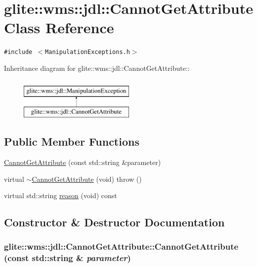 \hypertarget{classglite_1_1wms_1_1jdl_1_1CannotGetAttribute}{
\section{glite::wms::jdl::Cannot\-Get\-Attribute Class Reference}
\label{classglite_1_1wms_1_1jdl_1_1CannotGetAttribute}
}
{\tt \#include $<$Manipulation\-Exceptions.h$>$}

Inheritance diagram for glite::wms::jdl::Cannot\-Get\-Attribute::\begin{figure}[H]
\begin{center}
\leavevmode
\includegraphics[height=2cm]{classglite_1_1wms_1_1jdl_1_1CannotGetAttribute}
\end{center}
\end{figure}
\subsection*{Public Member Functions}
\begin{CompactItemize}
\item 
\hyperlink{classglite_1_1wms_1_1jdl_1_1CannotGetAttribute_a0}{Cannot\-Get\-Attribute} (const std::string \&parameter)
\item 
virtual \hyperlink{classglite_1_1wms_1_1jdl_1_1CannotGetAttribute_a1}{$\sim$Cannot\-Get\-Attribute} (void)  throw ()
\item 
virtual std::string \hyperlink{classglite_1_1wms_1_1jdl_1_1CannotGetAttribute_a2}{reason} (void) const 
\end{CompactItemize}


\subsection{Constructor \& Destructor Documentation}
\hypertarget{classglite_1_1wms_1_1jdl_1_1CannotGetAttribute_a0}{
\subsubsection[CannotGetAttribute]{\setlength{\rightskip}{0pt plus 5cm}glite::wms::jdl::Cannot\-Get\-Attribute::Cannot\-Get\-Attribute (const std::string \& {\em parameter})}}
\label{classglite_1_1wms_1_1jdl_1_1CannotGetAttribute_a0}


